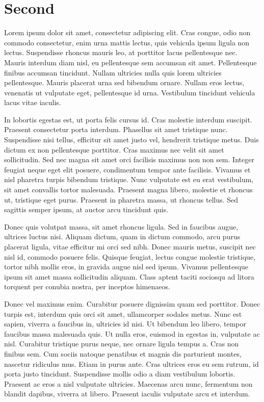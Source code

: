 \section{Second}

Lorem ipsum dolor sit amet, consectetur adipiscing elit. Cras congue, odio non commodo consectetur, enim urna mattis lectus, quis vehicula ipsum ligula non lectus. Suspendisse rhoncus mauris leo, at porttitor lacus pellentesque nec. Mauris interdum diam nisl, eu pellentesque sem accumsan sit amet. Pellentesque finibus accumsan tincidunt. Nullam ultricies nulla quis lorem ultricies pellentesque. Mauris placerat urna sed bibendum ornare. Nullam eros lectus, venenatis ut vulputate eget, pellentesque id urna. Vestibulum tincidunt vehicula lacus vitae iaculis.

In lobortis egestas est, ut porta felis cursus id. Cras molestie interdum suscipit. Praesent consectetur porta interdum. Phasellus sit amet tristique nunc. Suspendisse nisi tellus, efficitur sit amet justo vel, hendrerit tristique metus. Duis dictum ex non pellentesque porttitor. Cras maximus nec velit sit amet sollicitudin. Sed nec magna sit amet orci facilisis maximus non non sem. Integer feugiat neque eget elit posuere, condimentum tempor ante facilisis. Vivamus et nisl pharetra turpis bibendum tristique. Nunc vulputate est eu erat vestibulum, sit amet convallis tortor malesuada. Praesent magna libero, molestie et rhoncus ut, tristique eget purus. Praesent in pharetra massa, ut rhoncus tellus. Sed sagittis semper ipsum, at auctor arcu tincidunt quis.

Donec quis volutpat massa, sit amet rhoncus ligula. Sed in faucibus augue, ultrices luctus nisi. Aliquam dictum, quam in dictum commodo, arcu purus placerat ligula, vitae efficitur mi orci sed nibh. Donec mauris metus, suscipit nec nisl id, commodo posuere felis. Quisque feugiat, lectus congue molestie tristique, tortor nibh mollis eros, in gravida augue nisl sed ipsum. Vivamus pellentesque ipsum sit amet massa sollicitudin aliquam. Class aptent taciti sociosqu ad litora torquent per conubia nostra, per inceptos himenaeos.

Donec vel maximus enim. Curabitur posuere dignissim quam sed porttitor. Donec turpis est, interdum quis orci sit amet, ullamcorper sodales metus. Nunc est sapien, viverra a faucibus in, ultricies id nisi. Ut bibendum leo libero, tempor faucibus massa malesuada quis. Ut nulla eros, euismod in egestas in, vulputate ac nisl. Curabitur tristique purus neque, nec ornare ligula tempus a. Cras non finibus sem. Cum sociis natoque penatibus et magnis dis parturient montes, nascetur ridiculus mus. Etiam in purus ante. Cras ultrices eros eu sem rutrum, id porta justo tincidunt. Suspendisse mollis odio a diam vestibulum lobortis. Praesent ac eros a nisl vulputate ultricies. Maecenas arcu nunc, fermentum non blandit dapibus, viverra at libero. Praesent iaculis vulputate arcu et interdum.

